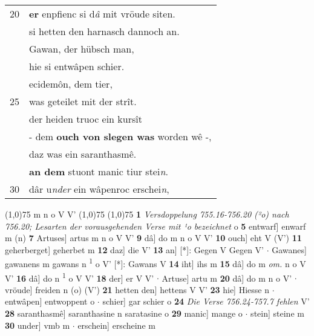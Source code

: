 \documentclass[8pt,a4paper,notitlepage]{article}
\begin{document}
\begin{table}[ht]
\begin{minipage}[t]{0.5\linewidth}
\begin{tabular}{rl}
20 & \textbf{er} enpfienc si d\textit{â} mit vröude siten.\\ 
 & si hetten den harnasch dannoch an.\\ 
 & Gawan, der hübsch man,\\ 
 & hie si entwâpen schier.\\ 
 & ecidemôn, dem tier,\\ 
25 & was geteilet mit der strît.\\ 
 & der heiden truoc ein kursît\\ 
 & - dem \textbf{ouch von slegen was} worden wê -,\\ 
 & daz was ein saranthasmê.\\ 
 & \textbf{an dem} stuont manic tiur stei\textit{n}.\\ 
30 & dâr u\textit{nder} ein wâpenroc erschei\textit{n},\\ 
\end{tabular}
\scriptsize
\line(1,0){75} \newline
m n o V V' \newline
\line(1,0){75} \newline
\newline
\line(1,0){75} \newline
\textbf{1} \textit{Versdoppelung 755.16-756.20 (²o) nach 756.20; Lesarten der vorausgehenden Verse mit ¹o bezeichnet} o  \textbf{5} entwarf] enwarf m (n) \textbf{7} Artuses] artus m n o V V' \textbf{9} dâ] do m n o V V' \textbf{10} ouch] eht V (V') \textbf{11} geherberget] geherbet m \textbf{12} daz] die V' \textbf{13} an] [*]: Gegen V Gegen V'  $\cdot$ Gawanes] gawanens m gawans n \textsuperscript{1}\hspace{-1.3mm} o V' [*]: Gawans V \textbf{14} iht] ihs m \textbf{15} dâ] do m \textit{om.} n o V V' \textbf{16} dâ] do n \textsuperscript{1}\hspace{-1.3mm} o V V' \textbf{18} der] er V V'  $\cdot$ Artuse] artu m \textbf{20} dâ] do m n o V'  $\cdot$ vröude] freiden n (o) (V') \textbf{21} hetten den] hettens V V' \textbf{23} hie] Hiesse n  $\cdot$ entwâpen] entwoppent o  $\cdot$ schier] gar schier o \textbf{24} \textit{Die Verse 756.24-757.7 fehlen} V'  \textbf{28} saranthasmê] saranthasine n saratasine o \textbf{29} manic] mange o  $\cdot$ stein] steine m \textbf{30} under] vmb m  $\cdot$ erschein] erscheine m \newline
\end{minipage}
\end{table}
\newpage
\end{document}
